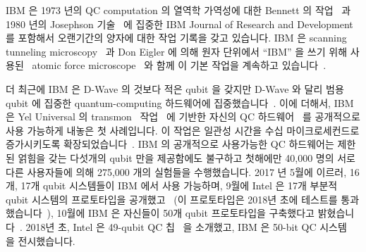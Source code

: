 IBM 은 1973 년의 QC computation 의 열역학 가역성에 대한 Bennett 의
작업~\cite{Bennett:1973:LRC:1664562.1664568} 과 1980 년의 Josephson
기술~\cite{1980:1663086} 에 집중한 IBM Journal of Research and Development 를
포함해서 오랜기간의 양자에 대한 작업 기록을 갖고 있습니다.
IBM 은 scanning tunneling microscopy~\cite{Binnig1982SurfaceSTM} 과 Don Eigler
에 의해 원자 단위에서 ``IBM'' 을 쓰기 위해
사용된~\cite{MalcolmWBrowne1990AFM-IBM} atomic force
microscope~\cite{1986PhRvL..56..930B} 와 함께 이 기본 작업을 계속하고
있습니다~\cite{Binnig1982SurfaceSTM}.

더 최근에 IBM 은 D-Wave 의 것보다 적은 qubit 을 갖지만 D-Wave 와 달리 범용
qubit 에 집중한 quantum-computing 하드웨어에
집중했습니다~\cite{BradJones2017IBM-QC-Announce,RobertHackett2017IBM-QC-Announce,AgamShah2017IBM-QC-50-qubit,DarioGill2017IBM-Universal-QC}.
이에 더해서, IBM 은 Yel Universal 의 transmon~\cite{WikipediaTransMon}
작업~\cite{PhysRevA.76.042319} 에 기반한 자신의 QC
하드웨어~\cite{IBM2016QuantumExperience,ArsTechnica2016IBMQuantumExperience,MikeVizard2017IBM-QC-Cloud}
를 공개적으로 사용 가능하게 내놓은 첫 사례입니다.
이 작업은 일관성 시간을 수십 마이크로세컨드로 증가시키도록
확장되었습니다~\cite{PhysRevLett.107.240501,PhysRevLett.111.080502,PhysRevB.86.100506}.
IBM 의 공개적으로 사용가능한 QC 하드웨어는 제한된 얽힘을 갖는 다섯개의 qubit
만을 제공함에도 불구하고 첫해에만 40,000 명의 서로 다른 사용자들에 의해 275,000
개의 실험들을 수행했습니다.
2017 년 5월에 이르러, 16개, 17개 qubit 시스템들이 IBM 에서 사용 가능하며, 9월에
Intel 은 17개 부분적 qubit 시스템의 프로토타입을
공개했고~\cite{Intel2017devlivers17qubit} (이 프로토타입은 2018년 초에 테스트를
통과했습니다~\cite{RyanFMandelbaum2018IntelQC}),
10월에 IBM 은 자신들이 50개 qubit 프로토타입을 구축했다고
밝혔습니다~\cite{WillKnight2017IBM50qubits}.
2018년 초, Intel 은 49-qubit QC 칩~\cite{JeremyHsu2018Intel50qubitsCES} 을
소개했고, IBM 은 50-bit QC 시스템~\cite{NickSummers2018IBM50qubitsCES} 을
전시했습니다.

